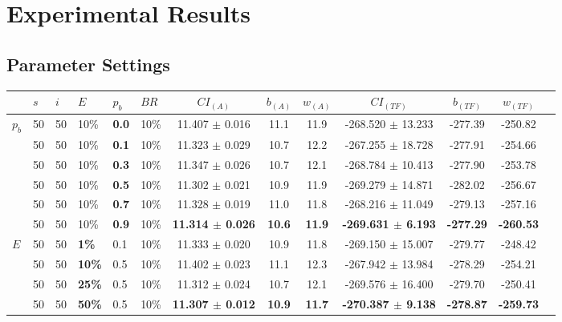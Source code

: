\chapter{Experimental Results}
\label{appendixC}

\section{Parameter Settings}

\begin{sidewaystable}
    \begin{tabular}{|l|l|l|l|l|l||c|c|c|c|c|c|c|}
    \hline
    ~ & $s$ & $i$ & $E$ & $p_{b}$ & $BR$ & $CI_{(A)}$ & $b_{(A)}$ & $w_{(A)}$ & $CI_{(TF)}$ & $b_{(TF)}$ & $w_{(TF)}$\\
    \hline
    $p_{b}$ & 50 & 50 & 10\% & \textbf{0.0} & 10\% & 11.407 $\pm$ 0.016 & 11.1 & 11.9 & -268.520 $\pm$ 13.233 & -277.39 & -250.82 \\
    ~ & 50 & 50 & 10\% & \textbf{0.1} & 10\% & 11.323 $\pm$ 0.029 & 10.7 & 12.2 & -267.255 $\pm$ 18.728 & -277.91 & -254.66 \\
    ~ & 50 & 50 & 10\% & \textbf{0.3} & 10\% & 11.347 $\pm$ 0.026 & 10.7 & 12.1 & -268.784 $\pm$ 10.413 & -277.90 & -253.78 \\
    ~ & 50 & 50 & 10\% & \textbf{0.5} & 10\% & 11.302 $\pm$ 0.021 & 10.9 & 11.9 & -269.279 $\pm$ 14.871 & -282.02 & -256.67\\
    ~ & 50 & 50 & 10\% & \textbf{0.7} & 10\% & 11.328 $\pm$ 0.019 & 11.0 & 11.8 & -268.216 $\pm$ 11.049 & -279.13 & -257.16\\
    ~ & 50 & 50 & 10\% & \textbf{0.9} & 10\% & \textbf{11.314 $\pm$ 0.026} & \textbf{10.6} & \textbf{11.9} & \textbf{-269.631 $\pm$ 6.193} & \textbf{-277.29} & \textbf{-260.53}\\
    \hline
    \hline
    $E$ & 50 & 50 & \textbf{1\%} & 0.1 & 10\% & 11.333 $\pm$ 0.020 & 10.9 & 11.8 & -269.150 $\pm$ 15.007 & -279.77 & -248.42 \\
    ~ & 50 & 50 & \textbf{10\%} & 0.5 & 10\% & 11.402 $\pm$ 0.023 & 11.1 & 12.3 & -267.942 $\pm$ 13.984 & -278.29 & -254.21 \\
    ~ & 50 & 50 & \textbf{25\%} & 0.5 & 10\% & 11.312 $\pm$ 0.024 & 10.7 & 12.1 & -269.576 $\pm$ 16.400 & -279.70 & -250.41 \\
    ~ & 50 & 50 & \textbf{50\%} & 0.5 & 10\% & \textbf{11.307 $\pm$ 0.012} & \textbf{10.9} & \textbf{11.7} & \textbf{-270.387 $\pm$ 9.138}  & \textbf{-278.87} & \textbf{-259.73} \\

\end{tabular}
\end{sidewaystable}
